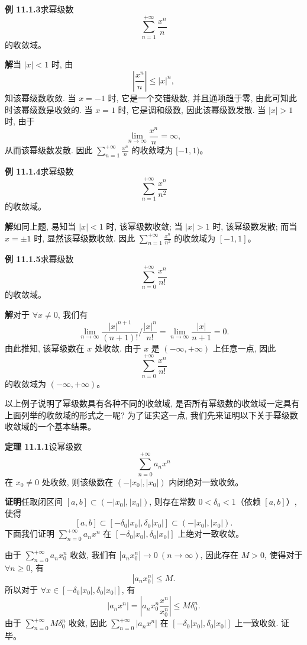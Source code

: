 \documentclass[UTF8,12pt,a4paper,fontset=fandol]{ctexart}
\begin{document}
\noindent\textbf{例 11.1.3}\quad 求幂级数
\[
  \sum_{n=1}^{+\infty}\frac{x^n}{n}
\]
的收敛域。

\noindent\textbf{解}\quad 当 $|x|<1$ 时, 由
\[
  \left|\frac{x^n}{n}\right|\leqslant |x|^n,
\]
知该幂级数收敛. 当 $x=-1$ 时, 它是一个交错级数, 并且通项趋于零, 由此可知此时该幂级数是收敛的. 当 $x=1$ 时, 它是调和级数, 因此该幂级数发散. 当 $|x|>1$ 时, 由于
\[
  \lim_{n\to\infty}\frac{x^n}{n}=\infty,
\]
从而该幂级数发散. 因此 $\sum_{n=1}^{+\infty}\frac{x^n}{n}$ 的收敛域为 $[-1,1)$。

\noindent\textbf{例 11.1.4}\quad 求幂级数
\[
  \sum_{n=1}^{+\infty}\frac{x^n}{n^2}
\]
的收敛域。

\noindent\textbf{解}\quad 如同上题, 易知当 $|x|<1$ 时, 该幂级数收敛; 当 $|x|>1$ 时, 该幂级数发散; 而当 $x=\pm1$ 时, 显然该幂级数收敛. 因此 $\sum_{n=1}^{+\infty}\frac{x^n}{n^2}$ 的收敛域为 $[-1,1]$。

\noindent\textbf{例 11.1.5}\quad 求幂级数
\[
  \sum_{n=0}^{+\infty}\frac{x^n}{n!}
\]
的收敛域。

\noindent\textbf{解}\quad 对于 $\forall x\ne0$, 我们有
\[
  \lim_{n\to\infty}
  \frac{|x|^{n+1}}{(n+1)!}\Big/\frac{|x|^n}{n!}
  =
  \lim_{n\to\infty}\frac{|x|}{n+1}=0.
\]
由此推知, 该幂级数在 $x$ 处收敛. 由于 $x$ 是 $(-\infty,+\infty)$ 上任意一点, 因此
\[
  \sum_{n=0}^{+\infty}\frac{x^n}{n!}
\]
的收敛域为 $(-\infty,+\infty)$。

以上例子说明了幂级数具有各种不同的收敛域, 是否所有幂级数的收敛域一定具有上面列举的收敛域的形式之一呢? 为了证实这一点, 我们先来证明以下关于幂级数收敛域的一个基本结果。

\noindent\textbf{定理 11.1.1}\quad 设幂级数
\[
  \sum_{n=0}^{+\infty}a_nx^n
\]
在 $x_0\ne0$ 处收敛, 则该级数在 $(-|x_0|,|x_0|)$ 内闭绝对一致收敛。

\noindent\textbf{证明}\quad 任取闭区间 $[a,b]\subset(-|x_0|,|x_0|)$, 则存在常数 $0<\delta_0<1$（依赖 $[a,b]$）, 使得
\[
  [a,b]\subset[-\delta_0|x_0|,\delta_0|x_0|]\subset(-|x_0|,|x_0|).
\]
下面我们证明 $\sum_{n=0}^{+\infty}a_nx^n$ 在 $[-\delta_0|x_0|,\delta_0|x_0|]$ 上绝对一致收敛。

由于 $\sum_{n=0}^{+\infty}a_nx_0^n$ 收敛, 我们有 $|a_nx_0^n|\to0\ (n\to\infty)$, 因此存在 $M>0$, 使得对于 $\forall n\geqslant0$, 有
\[
  |a_nx_0^n|\leqslant M.
\]
所以对于 $\forall x\in[-\delta_0|x_0|,\delta_0|x_0|]$, 有
\[
  |a_nx^n|
  =
  \left|a_nx_0^n\frac{x^n}{x_0^n}\right|
  \leqslant M\delta_0^n.
\]
由于 $\sum_{n=0}^{+\infty}M\delta_0^n$ 收敛, 因此 $\sum_{n=0}^{+\infty}|a_nx^n|$ 在 $[-\delta_0|x_0|,\delta_0|x_0|]$ 上一致收敛. 证毕。
\end{document}
